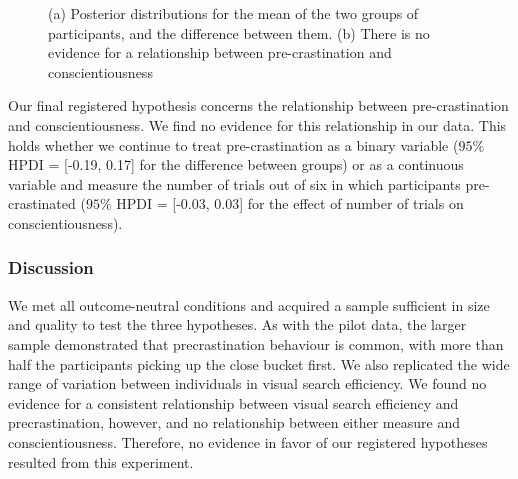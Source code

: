 \documentclass[]{rsos}
\begin{document}
\begin{figure}[t]
  \centering  
{}
  \caption{(a) Posterior distributions for the mean of the two groups of participants, and the difference between them. (b) There is no evidence for a relationship between pre-crastination and conscientiousness}
  \label{fig:full_exp_strategy}
\end{figure}

Our final registered hypothesis concerns the relationship between pre-crastination and conscientiousness. We find no evidence for this relationship in our data. This holds whether we continue to treat pre-crastination as a binary variable ($95\%$ HPDI = [-0.19, 0.17] for the difference between groups) or as a continuous variable and measure the number of trials out of six in which participants pre-crastinated ($95\%$ HPDI = [-0.03, 0.03] for the effect of number of trials on conscientiousness).


\subsubsection{Discussion}

We met all outcome-neutral conditions and acquired a sample sufficient in size and quality to test the three hypotheses. As with the pilot data, the larger sample demonstrated that precrastination behaviour is common, with more than half the participants picking up the close bucket first. We also replicated the wide range of variation between individuals in visual search efficiency. We found no evidence for a consistent relationship between visual search efficiency and precrastination, however, and no relationship between either measure and conscientiousness. Therefore, no evidence in favor of our registered hypotheses resulted from this experiment. 
\end{document}
